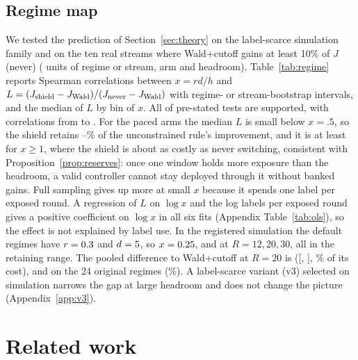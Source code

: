 \documentclass{article}
\theoremstyle{plain}
\theoremstyle{definition}
\begin{document}
\subsection{Regime map}
We tested the prediction of Section~\ref{sec:theory} on the label-scarce simulation family and on the ten real streams where Wald+cutoff gains at least 10\% of $J$(never) (\NUnits{} units of regime or stream, arm and headroom). Table~\ref{tab:regime} reports Spearman correlations between $x=rd/h$ and $L=(J_{\rm shield}-J_{\rm Wald})/(J_{\rm never}-J_{\rm Wald})$ with regime- or stream-bootstrap intervals, and the median of $L$ by bin of $x$. All \RegimeTestsSupported{} of \RegimeTestsTotal{} pre-stated tests are supported, with correlations from \SpearLo{} to \SpearHi. For the paced arms the median $L$ is small below $x=.5$, so the shield retains \KeepLo--\KeepHi\% of the unconstrained rule's improvement, and it is at least \LargeXMin{} for $x\ge1$, where the shield is about as costly as never switching, consistent with Proposition~\ref{prop:reserves}: once one window holds more exposure than the headroom, a valid controller cannot stay deployed through it without banked gains. Full sampling gives up more at small $x$ because it spends one label per exposed round. A regression of $L$ on $\log x$ and the log labels per exposed round gives a positive coefficient on $\log x$ in all six fits (Appendix Table~\ref{tab:ols}), so the effect is not explained by label use. In the registered simulation the default regimes have $r=0.3$ and $d=5$, so $x=0.25$, \DefXTwenty{} and \DefXThirty{} at $R=12,20,30$, all in the retaining range. The pooled difference to Wald+cutoff at $R=20$ is \SimVsWaldDelta{} ([\SimVsWaldLo, \SimVsWaldHi], \SimVsWaldPct\% of its cost), and \OrigDelta{} on the 24 original regimes (\OrigPct\%). A label-scarce variant (v3) selected on simulation narrows the gap at large headroom and does not change the picture (Appendix~\ref{app:v3}).

\begin{table}[t]
\caption{Regime map: Spearman correlation of $x=rd/h$ with $L$, the share of the unconstrained rule's improvement given up, and median $L$ by bin of $x$. Source: \texttt{exposure\_ratio\_test.json}.}\label{tab:regime}
\centering\scriptsize
\resizebox{\columnwidth}{!}{}
\end{table}

\section{Related work}
\end{document}
